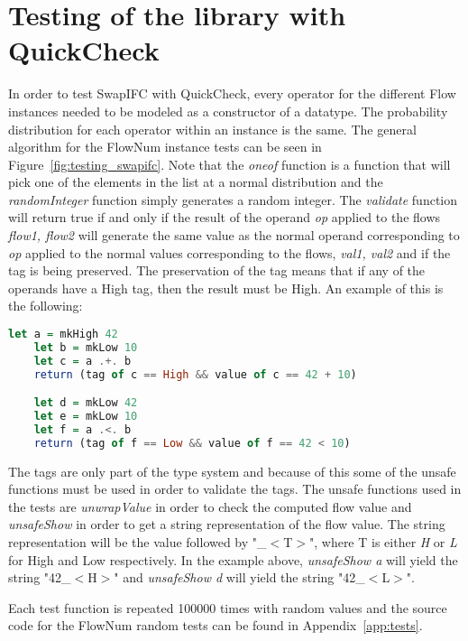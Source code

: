 \section{Testing of the library with QuickCheck}
In order to test SwapIFC with QuickCheck, every operator for the different Flow instances needed to be modeled as a constructor of a datatype. The probability distribution for each operator within an instance is the same. The general algorithm for the FlowNum instance tests can be seen in Figure~\ref{fig:testing_swapifc}. Note that the \emph{oneof} function is a function that will pick one of the elements in the list at a normal distribution and the \emph{randomInteger} function simply generates a random integer. The \emph{validate} function will return true if and only if the result of the operand \emph{op} applied to the flows \emph{flow1, flow2} will generate the same value as the normal operand corresponding to \emph{op} applied to the normal values corresponding to the flows, \emph{val1, val2} and if the tag is being preserved. The preservation of the tag means that if any of the operands have a High tag, then the result must be High. An example of this is the following:
\begin{center}
  \begin{lstlisting}[language=Haskell]
    let a = mkHigh 42
    let b = mkLow 10
    let c = a .+. b
    return (tag of c == High && value of c == 42 + 10)

    let d = mkLow 42
    let e = mkLow 10
    let f = a .<. b
    return (tag of f == Low && value of f == 42 < 10)
  \end{lstlisting}
\end{center}

The tags are only part of the type system and because of this some of the unsafe functions must be used in order to validate the tags. The unsafe functions used in the tests are \emph{unwrapValue} in order to check the computed flow value and \emph{unsafeShow} in order to get a string representation of the flow value. The string representation will be the value followed by "\_$<$T$>$", where T is either \emph{H} or \emph{L} for High and Low respectively. In the example above, \emph{unsafeShow a} will yield the string "42\_$<$H$>$" and \emph{unsafeShow d} will yield the string "42\_$<$L$>$".

Each test function is repeated 100000 times with random values and the source code for the FlowNum random tests can be found in Appendix~\ref{app:tests}.

